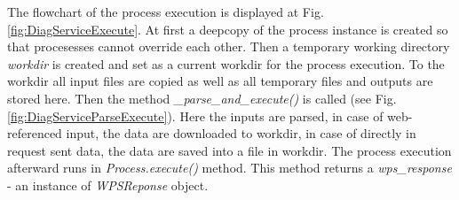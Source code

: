 \documentclass[12pt,a4paper]{article}
\begin{document}
\begin{figure}[h!]
\centering
\begin{floatrow}
\end{floatrow}
\end{figure}

The flowchart of the process execution is displayed at Fig. \ref{fig:DiagServiceExecute}. 
At first a deepcopy of the process instance is created so that procesesses cannot override each other. Then a temporary working directory \textit{workdir} is created and set as a current workdir for the process execution. To the workdir all input files are
copied as well as all temporary files and outputs are stored here. Then the method \textit{\_parse\_and\_execute()} is called (see
Fig. \ref{fig:DiagServiceParseExecute}). Here the inputs are parsed, in case of web-referenced input, the data are downloaded to workdir, in case of directly in request sent data, the data are saved into a file in workdir. The process execution afterward runs in \textit{Process.execute()} method. This method returns a \textit{wps\_response} - an instance of \textit{WPSReponse} object.
\end{document}
